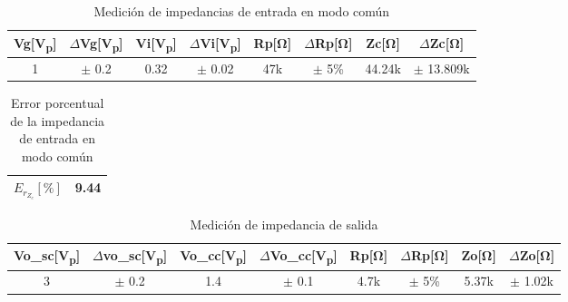 \begin{enumerate}
        \begin{table}[H]
          \centering
          \begin{tabular}{|c|c|c|c|c|c|c|c|}
            \hline
            \textbf{Vg[V\textsubscript{p}]} & \textbf{\(\Delta\)Vg[V\textsubscript{p}]} & \textbf{Vi[V\textsubscript{p}]} & \textbf{\(\Delta\)Vi[V\textsubscript{p}]} & \textbf{Rp[Ω]} & \textbf{\(\Delta\)Rp[Ω]} & \textbf{Zc[Ω]} & \textbf{\(\Delta\)Zc[Ω]} \\\hline
            1                               & \(\pm\) 0.2                               & 0.32                            & \(\pm\) 0.02                              & 47k            & \(\pm\) 5\%              & 44.24k         & \(\pm\) 13.809k          \\\hline
          \end{tabular}
          \caption{Medición de impedancias de entrada en modo común}
          \label{tab:impedancias_entrada_comun}
        \end{table}

        \begin{table}[H]
          \centering
          \begin{tabular}{|c|c|}
            \hline
            $E_{r_{Z_{c}}} [\%]$ & 9.44 \\
            \hline
          \end{tabular}
          \caption{Error porcentual de la impedancia de entrada en modo común}
          \label{tab:error_porcentual2_zc}
        \end{table}


        \begin{table}[H]
          \centering
          \begin{tabular}{|c|c|c|c|c|c|c|c|}
            \hline
            \textbf{Vo\_sc[V\textsubscript{p}]} & \textbf{\(\Delta\)vo\_sc[V\textsubscript{p}]} & \textbf{Vo\_cc[V\textsubscript{p}]} & \textbf{\(\Delta\)Vo\_cc[V\textsubscript{p}]} & \textbf{Rp[Ω]} & \textbf{\(\Delta\)Rp[Ω]} & \textbf{Zo[Ω]} & \textbf{\(\Delta\)Zo[Ω]} \\\hline
            3                                   & \(\pm\) 0.2                                   & 1.4                                 & \(\pm\) 0.1                                   & 4.7k           & \(\pm\) 5\%              & 5.37k          & \(\pm\) 1.02k            \\\hline
          \end{tabular}
          \caption{Medición de impedancia de salida}
          \label{tab:impedancias_salida}
        \end{table}



\end{enumerate}
